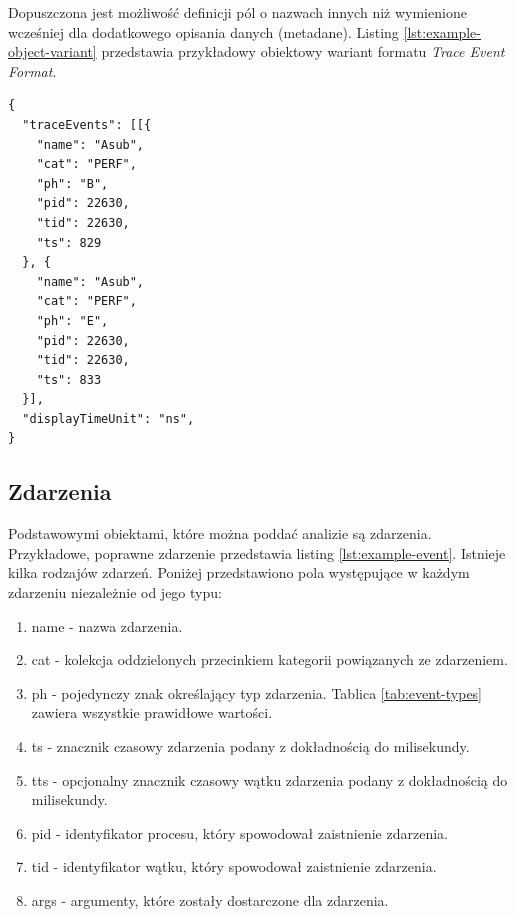 \documentclass[polish, twoside, 12pt]{mwart}
\begin{document}
Dopuszczona jest możliwość definicji pól o nazwach innych niż wymienione wcześniej dla dodatkowego opisania danych (metadane). Listing \ref{lst:example-object-variant} przedstawia przykładowy obiektowy wariant formatu \emph{Trace Event Format}.

\begin{lstlisting}[caption=Przykładowy wariant obiektowy, label={lst:example-object-variant}]
{
  "traceEvents": [[{
    "name": "Asub",
    "cat": "PERF",
    "ph": "B",
    "pid": 22630,
    "tid": 22630,
    "ts": 829
  }, {
    "name": "Asub",
    "cat": "PERF",
    "ph": "E",
    "pid": 22630,
    "tid": 22630,
    "ts": 833
  }],
  "displayTimeUnit": "ns",
}
\end{lstlisting}

\subsection{Zdarzenia}

Podstawowymi obiektami, które można poddać analizie są zdarzenia. Przykładowe, poprawne zdarzenie przedstawia listing \ref{lst:example-event}. Istnieje kilka rodzajów zdarzeń. Poniżej przedstawiono pola występujące w każdym zdarzeniu niezależnie od jego typu:

\begin{enumerate}
  \item name - nazwa zdarzenia.
  \item cat - kolekcja oddzielonych przecinkiem kategorii powiązanych ze zdarzeniem.
  \item ph - pojedynczy znak określający typ zdarzenia. Tablica \ref{tab:event-types} zawiera wszystkie prawidłowe wartości.
  \item ts - znacznik czasowy zdarzenia podany z dokładnością do milisekundy.
  \item tts - opcjonalny znacznik czasowy wątku zdarzenia podany z dokładnością do milisekundy.
  \item pid - identyfikator procesu, który spowodował zaistnienie zdarzenia.
  \item tid - identyfikator wątku, który spowodował zaistnienie zdarzenia.
  \item args - argumenty, które zostały dostarczone dla zdarzenia.
\end{enumerate}
\end{document}
